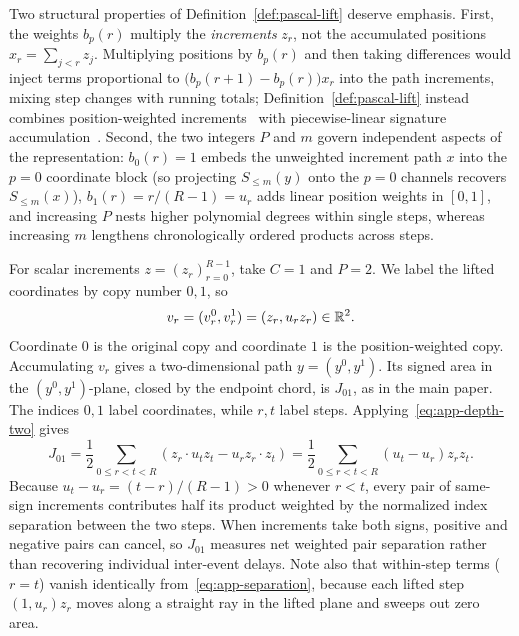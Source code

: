 Two structural properties of Definition~\ref{def:pascal-lift} deserve emphasis.
First, the weights \(b_p(r)\) multiply the \emph{increments} \(z_r\), not the
accumulated positions \(x_r = \sum_{j < r} z_j\). Multiplying positions by
\(b_p(r)\) and then taking differences would inject terms proportional to
\(\bigl(b_p(r+1) - b_p(r)\bigr) x_r\) into the path increments, mixing step
changes with running totals; Definition~\ref{def:pascal-lift} instead combines
position-weighted increments~\cite{fruits} with piecewise-linear signature
accumulation~\cite{generalised}. Second, the two integers \(P\) and \(m\) govern
independent aspects of the representation: \(b_0(r) = 1\) embeds the unweighted
increment path \(x\) into the \(p=0\) coordinate block (so projecting
\(S_{\leq m}(y)\) onto the \(p=0\) channels recovers \(S_{\leq m}(x)\)),
\(b_1(r) = r/(R-1) = u_r\) adds linear position weights in \([0,1]\), and
increasing \(P\) nests higher polynomial degrees within single steps, whereas
increasing \(m\) lengthens chronologically ordered products across steps.

For scalar increments \(z=(z_r)_{r=0}^{R-1}\), take \(C=1\) and \(P=2\).
We label the lifted coordinates by copy number \(0,1\), so
\[
 v_r=(v_r^0,v_r^1)=(z_r,u_r z_r)\in\mathbb{R}^2.
\]
Coordinate \(0\) is the original copy and coordinate \(1\) is the
position-weighted copy. Accumulating \(v_r\) gives a two-dimensional path
\(y=(y^0,y^1)\). Its signed area in the \((y^0,y^1)\)-plane, closed by the
endpoint chord, is \(J_{01}\), as in the main paper. The indices \(0,1\)
label coordinates, while \(r,t\) label steps. Applying~\eqref{eq:app-depth-two} gives
\begin{equation}\label{eq:app-separation}
 J_{01} = \frac{1}{2}\sum_{0 \leq r < t < R} (z_r \cdot u_t z_t - u_r z_r \cdot z_t)
        = \frac{1}{2}\sum_{0 \leq r < t < R} (u_t - u_r) z_r z_t.
\end{equation}
Because \(u_t - u_r = (t - r)/(R-1) > 0\) whenever \(r < t\), every pair of
same-sign increments contributes half its product weighted by the normalized
index separation between the two steps. When increments take both signs,
positive and negative pairs can cancel, so \(J_{01}\) measures net weighted pair
separation rather than recovering individual inter-event delays. Note also that
within-step terms (\(r = t\)) vanish identically from~\eqref{eq:app-separation},
because each lifted step \((1, u_r) z_r\) moves along a straight ray in the
lifted plane and sweeps out zero area.

